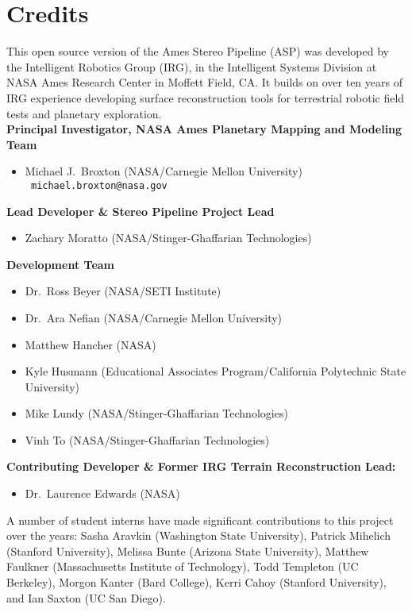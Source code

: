 
\chapter*{Credits}

This open source version of the Ames Stereo Pipeline (ASP) was
developed by the Intelligent Robotics Group (IRG), in the Intelligent
Systems Division at NASA Ames Research Center in Moffett Field, CA. It
builds on over ten years of IRG experience developing surface
reconstruction tools for terrestrial robotic field tests and planetary
exploration. \\

{\bf Principal Investigator, NASA Ames Planetary Mapping and Modeling Team}
\begin {itemize} 
\item Michael J.~Broxton (NASA/Carnegie Mellon University)\\ {\tt
  michael.broxton@nasa.gov}\\
\end{itemize}

{\bf Lead Developer \& Stereo Pipeline Project Lead}
\begin {itemize} 
\item Zachary Moratto (NASA/Stinger-Ghaffarian Technologies)
\end{itemize}

{\bf Development Team}
\begin{itemize}
\item Dr.~Ross Beyer (NASA/SETI Institute)
\item Dr.~Ara Nefian (NASA/Carnegie Mellon University)
\item Matthew Hancher (NASA)
\item Kyle Husmann (Educational Associates Program/California Polytechnic State University)
\item Mike Lundy (NASA/Stinger-Ghaffarian Technologies)
\item Vinh To (NASA/Stinger-Ghaffarian Technologies)
\end{itemize}

{\bf Contributing Developer \& Former IRG Terrain Reconstruction Lead:}
\begin{itemize}
\item Dr.\ Laurence Edwards (NASA)
\end{itemize}

A number of student interns have made significant contributions to
this project over the years: Sasha Aravkin (Washington State
University), Patrick
Mihelich (Stanford University), Melissa Bunte (Arizona State
University), Matthew Faulkner (Massachusetts Institute of Technology),
Todd Templeton (UC Berkeley), Morgon Kanter (Bard College), Kerri
Cahoy (Stanford University), and Ian Saxton (UC San Diego).

